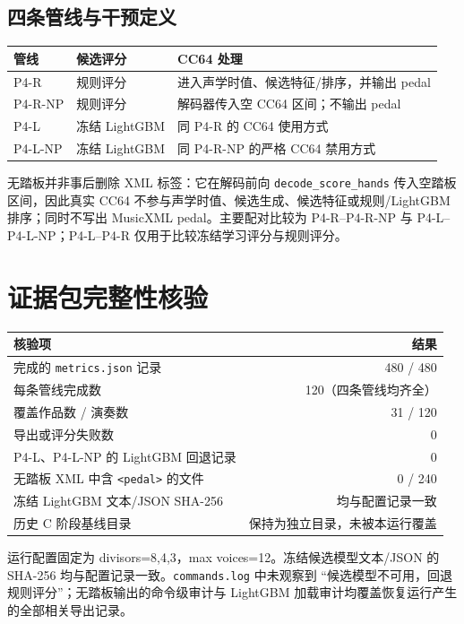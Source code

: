 \documentclass[11pt,a4paper]{ctexart}
\begin{document}
\subsection{四条管线与干预定义}
\begin{center}
\begin{tabular}{lll}
\toprule
管线 & 候选评分 & CC64 处理 \\
\midrule
P4-R & 规则评分 & 进入声学时值、候选特征/排序，并输出 pedal \\
P4-R-NP & 规则评分 & 解码器传入空 CC64 区间；不输出 pedal \\
P4-L & 冻结 LightGBM & 同 P4-R 的 CC64 使用方式 \\
P4-L-NP & 冻结 LightGBM & 同 P4-R-NP 的严格 CC64 禁用方式 \\
\bottomrule
\end{tabular}
\end{center}

无踏板并非事后删除 XML 标签：它在解码前向 \texttt{decode\_score\_hands} 传入空踏板区间，因此真实 CC64 不参与声学时值、候选生成、候选特征或规则/LightGBM 排序；同时不写出 MusicXML pedal。主要配对比较为 P4-R--P4-R-NP 与 P4-L--P4-L-NP；P4-L--P4-R 仅用于比较冻结学习评分与规则评分。

\section{证据包完整性核验}
\begin{center}
\begin{tabular}{p{}r}
\toprule
核验项 & 结果 \\
\midrule
完成的 \texttt{metrics.json} 记录 & 480 / 480 \\
每条管线完成数 & 120（四条管线均齐全） \\
覆盖作品数 / 演奏数 & 31 / 120 \\
导出或评分失败数 & 0 \\
P4-L、P4-L-NP 的 LightGBM 回退记录 & 0 \\
无踏板 XML 中含 \texttt{<pedal>} 的文件 & 0 / 240 \\
冻结 LightGBM 文本/JSON SHA-256 & 均与配置记录一致 \\
历史 C 阶段基线目录 & 保持为独立目录，未被本运行覆盖 \\
\bottomrule
\end{tabular}
\end{center}

运行配置固定为 divisors=8,4,3，max voices=12。冻结候选模型文本/JSON 的 SHA-256 均与配置记录一致。\texttt{commands.log} 中未观察到 ``候选模型不可用，回退规则评分''；无踏板输出的命令级审计与 LightGBM 加载审计均覆盖恢复运行产生的全部相关导出记录。
\end{document}
